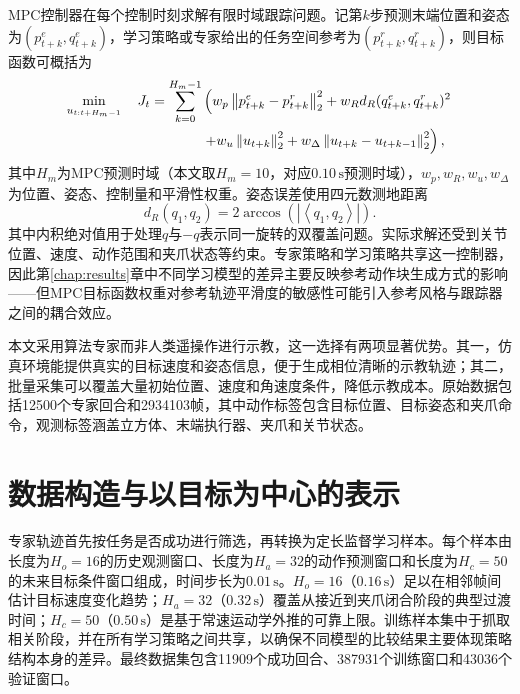 MPC控制器在每个控制时刻求解有限时域跟踪问题\citep{rawlings2017model,nubert2020safe}。记第$k$步预测末端位置和姿态为$(p^e_{t+k},q^e_{t+k})$，学习策略或专家给出的任务空间参考为$(p^r_{t+k},q^r_{t+k})$，则目标函数可概括为
\begin{align}
    \min_{u_{t:t+H_m-1}}\quad
    J_t = \sum_{k=0}^{H_m-1} &\left(
        w_p\left\|p^e_{t+k}-p^r_{t+k}\right\|_2^2
        + w_R d_R(q^e_{t+k},q^r_{t+k})^2 \right. \notag \\
        &\left. + w_u\left\|u_{t+k}\right\|_2^2
        + w_\Delta\left\|u_{t+k}-u_{t+k-1}\right\|_2^2
    \right),
    \label{eq:mpc-objective}
\end{align}
其中$H_m$为MPC预测时域（本文取$H_m=10$，对应$0.10\,\mathrm{s}$预测时域），$w_p,w_R,w_u,w_\Delta$为位置、姿态、控制量和平滑性权重。姿态误差使用四元数测地距离
\begin{equation}
    d_R(q_1,q_2)=2\arccos\left(\left|\left\langle q_1,q_2\right\rangle\right|\right).
    \label{eq:quat-distance}
\end{equation}
其中内积绝对值用于处理$q$与$-q$表示同一旋转的双覆盖问题。实际求解还受到关节位置、速度、动作范围和夹爪状态等约束。专家策略和学习策略共享这一控制器，因此第\ref{chap:results}章中不同学习模型的差异主要反映参考动作块生成方式的影响——但MPC目标函数权重对参考轨迹平滑度的敏感性可能引入参考风格与跟踪器之间的耦合效应。

本文采用算法专家而非人类遥操作进行示教，这一选择有两项显著优势。其一，仿真环境能提供真实的目标速度和姿态信息，便于生成相位清晰的示教轨迹；其二，批量采集可以覆盖大量初始位置、速度和角速度条件，降低示教成本。原始数据包括12500个专家回合和2934103帧，其中动作标签包含目标位置、目标姿态和夹爪命令，观测标签涵盖立方体、末端执行器、夹爪和关节状态。

\section{数据构造与以目标为中心的表示}

专家轨迹首先按任务是否成功进行筛选，再转换为定长监督学习样本。每个样本由长度为$H_o=16$的历史观测窗口、长度为$H_a=32$的动作预测窗口和长度为$H_c=50$的未来目标条件窗口组成，时间步长为$0.01\,\mathrm{s}$。$H_o=16$（$0.16\,\mathrm{s}$）足以在相邻帧间估计目标速度变化趋势；$H_a=32$（$0.32\,\mathrm{s}$）覆盖从接近到夹爪闭合阶段的典型过渡时间；$H_c=50$（$0.50\,\mathrm{s}$）是基于常速运动学外推的可靠上限。训练样本集中于抓取相关阶段，并在所有学习策略之间共享，以确保不同模型的比较结果主要体现策略结构本身的差异。最终数据集包含11909个成功回合、387931个训练窗口和43036个验证窗口。

